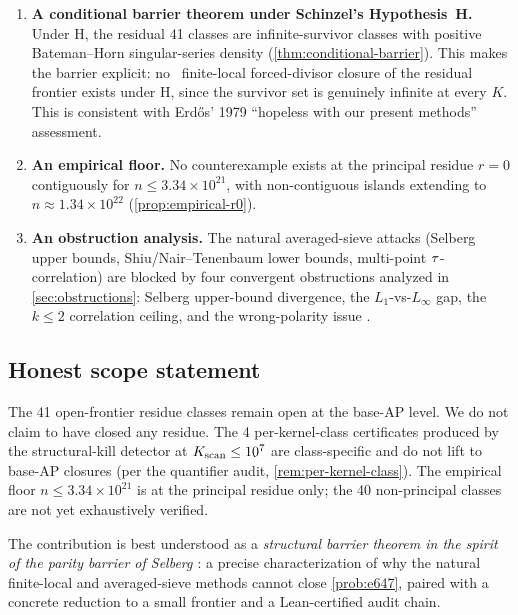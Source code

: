 \begin{enumerate}[leftmargin=*]
\item \textbf{A conditional barrier theorem under Schinzel's
Hypothesis~H.} Under H, the residual 41 classes are infinite-survivor
classes with positive Bateman--Horn singular-series density
(\cref{thm:conditional-barrier}). This makes the barrier explicit:
no \PLEclass\ finite-local forced-divisor closure of the residual
frontier exists under H, since the survivor set is genuinely infinite
at every $K$. This is consistent with Erd\H{o}s' 1979 ``hopeless with
our present methods'' assessment.

\item \textbf{An empirical floor.} No counterexample exists at the
principal residue $r = 0$ contiguously for $n \le 3.34 \times 10^{21}$,
with non-contiguous islands extending to $n \approx 1.34 \times 10^{22}$
(\cref{prop:empirical-r0}).

\item \textbf{An obstruction analysis.} The natural averaged-sieve
attacks (Selberg upper bounds, Shiu/Nair--Tenenbaum lower bounds,
multi-point $\tau$-correlation) are blocked by four convergent
obstructions analyzed in \cref{sec:obstructions}: Selberg upper-bound
divergence, the $L_1$-vs-$L_\infty$ gap, the $k \le 2$ correlation
ceiling, and the wrong-polarity issue
\cite{TaoTeravainen2025, MRT2019, MSTT2024_I, MSTT2024_II,
Maynard2013, Maynard2014}.
\end{enumerate}

\subsection{Honest scope statement}

The 41 open-frontier residue classes remain open at the base-AP level. We
do not claim to have closed any residue. The 4 per-kernel-class
certificates produced by the structural-kill detector at
$K_{\rm scan} \le 10^7$ are class-specific and do not lift to base-AP
closures (per the quantifier audit, \cref{rem:per-kernel-class}). The
empirical floor $n \le 3.34 \times 10^{21}$ is at the principal
residue only; the 40 non-principal classes are not yet exhaustively
verified.

The contribution is best understood as a
\emph{structural barrier theorem in the spirit of the parity barrier
of Selberg \cite{Selberg1949}}: a precise
characterization of why the natural finite-local
and averaged-sieve methods cannot close \cref{prob:e647}, paired
with a concrete reduction to a small frontier and a Lean-certified
audit chain.


